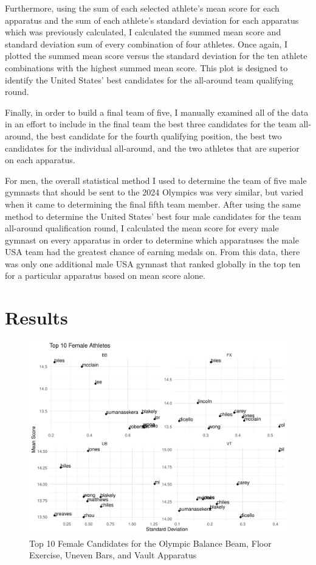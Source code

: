\documentclass[12pt]{article}
\begin{document}
Furthermore, using the sum of each selected athlete's mean score for each apparatus and the sum of each athlete's standard 
deviation for each apparatus which was previously calculated, I calculated the summed mean score and standard deviation sum 
of every combination of four athletes. Once again, I plotted the summed mean score versus the standard deviation for the ten 
athlete combinations with the highest summed mean score. This plot is designed to identify the United States' best 
candidates for the all-around team qualifying round.

Finally, in order to build a final team of five, I manually examined all of the data in an effort to include in 
the final team the best three candidates for the team all-around, the best candidate for the fourth qualifying position, 
the best two candidates for the individual all-around, and the two athletes that are superior on each apparatus.

For men, the overall statistical method I used to determine the team of five male gymnasts that should be sent 
to the 2024 Olympics was very similar, but varied when it came to determining the final fifth team member. After 
using the same method to determine the United States' best four male candidates for the team all-around qualification 
round, I calculated the mean score for every male gymnast on every apparatus in order to determine which apparatuses 
the male USA team had the greatest chance of earning medals on. From this data, there was only one additional male 
USA gymnast that ranked globally in the top ten for a particular apparatus based on mean score alone.

\section{Results}
\label{sec:res}

\begin{figure}
  \centering
  \includegraphics[scale=0.7]{FemaleAthleteApparatus.pdf}
  \caption{Top 10 Female Candidates for the Olympic Balance Beam, Floor Exercise, Uneven Bars, and Vault Apparatus}
  \label{fig:FA}
\end{figure}
\end{document}
